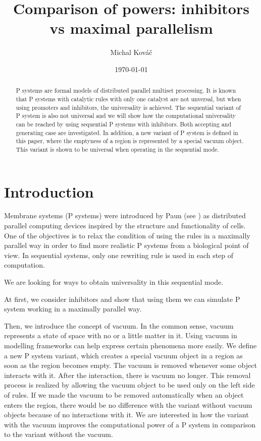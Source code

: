 \documentclass[a4paper,10pt]{article}
\begin{document}
\title{Comparison of powers: inhibitors vs maximal parallelism}
\author{Michal Kováč}
\date{\today}
\maketitle

\begin{abstract}
P systems are formal models of distributed parallel multiset processing.
It is known that P systems with catalytic rules with only one catalyst are not unversal, but when using promoters and inhibitors, the universality is achieved.
The sequential variant of P system is also not universal and we will show how the computational universality can be reached by using sequential P systems with inhibitors. Both accepting and generating case are investigated.
In addition, a new variant of P system is defined in this paper, where the emptyness of a region is represented by a special vacuum object. This variant is shown to be universal when operating in the sequential mode.
\end{abstract}

\section{Introduction}
\label{sec:introduction}


Membrane systems (P systems) were introduced by Paun (see \cite{Paun2000108}) as distributed parallel computing devices inspired by the structure and functionality of cells.
One of the objectives is to relax the condition of using the rules in a maximally parallel way in order to find more realistic P systems from a biological point of view.
In sequential systems, only one rewriting rule is used in each step of computation.


We are looking for ways to obtain universality in this sequential mode.


At first, we consider inhibitors and show that using them we can simulate P system working in a maximally parallel way.


Then, we introduce the concept of vacuum. In the common sense, vacuum represents a state of space with no or a little matter in it. Using vacuum in modelling frameworks can help express certain phenomena more easily.
We define a new P system variant, which creates a special vacuum object in a region as soon as the region becomes empty. The vacuum is removed whenever some object interacts with it. After the interaction, there is vacuum no longer. This removal process is realized by allowing the vacuum object to be used only on the left side of rules.
If we made the vacuum to be removed automatically when an object enters the region, there would be no difference with the variant without vacuum objects because of no interactions with it.
We are interested in how the variant with the vacuum improves the computational power of a P system in comparison to the variant without the vacuum.
\end{document}
